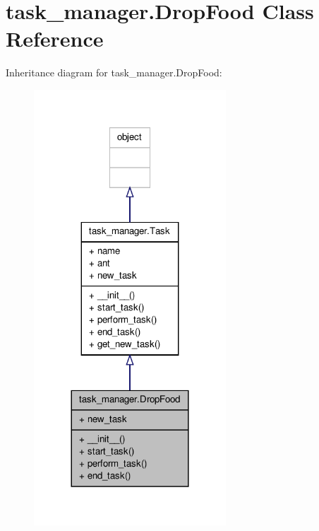 \hypertarget{classtask__manager_1_1DropFood}{\section{task\+\_\+manager.\+Drop\+Food Class Reference}
\label{classtask__manager_1_1DropFood}
}


Inheritance diagram for task\+\_\+manager.\+Drop\+Food\+:
\nopagebreak
\begin{figure}[H]
\begin{center}
\leavevmode
\includegraphics[width=204pt]{classtask__manager_1_1DropFood__inherit__graph}
\end{center}
\end{figure}


